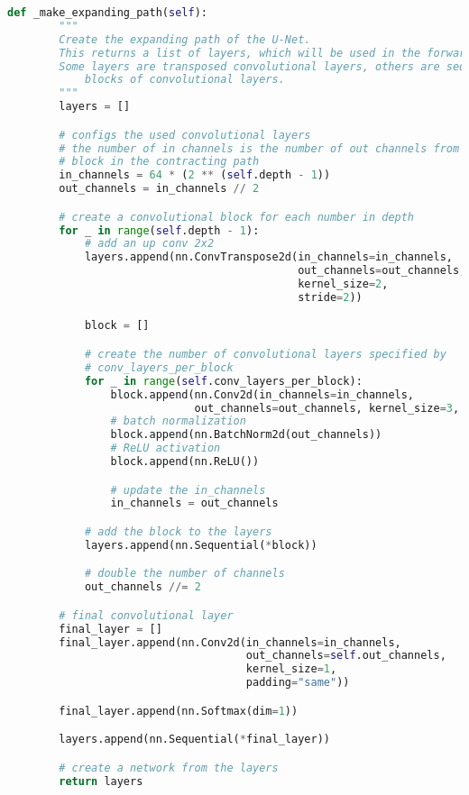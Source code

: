 \begin{lstlisting}[language=Python, caption={U-Net architecture for semantic segmentation}]
    def _make_expanding_path(self):
        """
        Create the expanding path of the U-Net.
        This returns a list of layers, which will be used in the forward pass.
        Some layers are transposed convolutional layers, others are sequential
            blocks of convolutional layers.
        """
        layers = []

        # configs the used convolutional layers
        # the number of in channels is the number of out channels from the last
        # block in the contracting path
        in_channels = 64 * (2 ** (self.depth - 1))
        out_channels = in_channels // 2

        # create a convolutional block for each number in depth
        for _ in range(self.depth - 1):
            # add an up conv 2x2
            layers.append(nn.ConvTranspose2d(in_channels=in_channels,
                                             out_channels=out_channels,
                                             kernel_size=2,
                                             stride=2))

            block = []

            # create the number of convolutional layers specified by
            # conv_layers_per_block
            for _ in range(self.conv_layers_per_block):
                block.append(nn.Conv2d(in_channels=in_channels,
                             out_channels=out_channels, kernel_size=3, padding="same"))
                # batch normalization
                block.append(nn.BatchNorm2d(out_channels))
                # ReLU activation
                block.append(nn.ReLU())

                # update the in_channels
                in_channels = out_channels

            # add the block to the layers
            layers.append(nn.Sequential(*block))

            # double the number of channels
            out_channels //= 2

        # final convolutional layer
        final_layer = []
        final_layer.append(nn.Conv2d(in_channels=in_channels,
                                     out_channels=self.out_channels,
                                     kernel_size=1,
                                     padding="same"))

        final_layer.append(nn.Softmax(dim=1))

        layers.append(nn.Sequential(*final_layer))

        # create a network from the layers
        return layers
\end{lstlisting}

